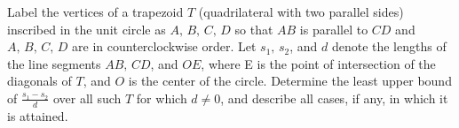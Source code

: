 Label the vertices of a trapezoid $T$ (quadrilateral with two parallel sides)
inscribed in the unit circle as $A,\,B,\,C,\,D$ so that $AB$ is parallel to
$CD$ and $A,\,B,\,C,\,D$ are in counterclockwise order. Let
$s_1,\,s_2$, and $d$ denote the lengths of the line segments
$AB,\, CD$, and $OE$, where E  is the point of intersection of the diagonals
of $T$, and $O$ is the center of the circle. Determine the least upper bound of
$\frac{s_1-s_2}{d}$ over all such $T$ for which $d\ne 0$, and describe all
cases, if any, in which it is attained.
